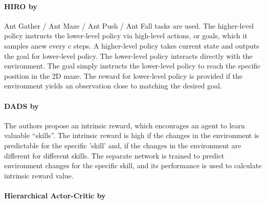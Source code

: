 \documentclass[acmsmall, nonacm]{acmart}
\begin{document}
\paragraph{HIRO by~\citet{Nachum2018DataEfficientHR}} %
\label{par:hiro}

Ant Gather / Ant Maze / Ant Push / Ant Fall tasks are used. The higher-level policy instructs the lower-level policy via high-level actions, or goals, which it samples anew every c steps. A higher-level policy takes current state and outputs the goal for lower-level policy. The lower-level policy interacts directly with the environment. The goal simply instructs the lower-level policy to reach the specific position in the 2D maze. The reward for lower-level policy is provided if the environment yields an observation close to matching the desired goal.


\paragraph{DADS by~\citet{Sharma2020DynamicsAwareUD}} %
\label{par:dads}

The authors propose an intrinsic reward, which encourages an agent to learn valuable ``skills''. The intrinsic reward is high if the changes in the environment is predictable for the specific 'skill' and, if the changes in the environment are different for different skills. The separate network is trained to predict environment changes for the specific skill, and its performance is used to calculate intrinsic reward value.


\paragraph{Hierarchical Actor-Critic by~\citet{levy2018hierarchical}} %
\label{par:hierarchical_ac}


\end{document}
